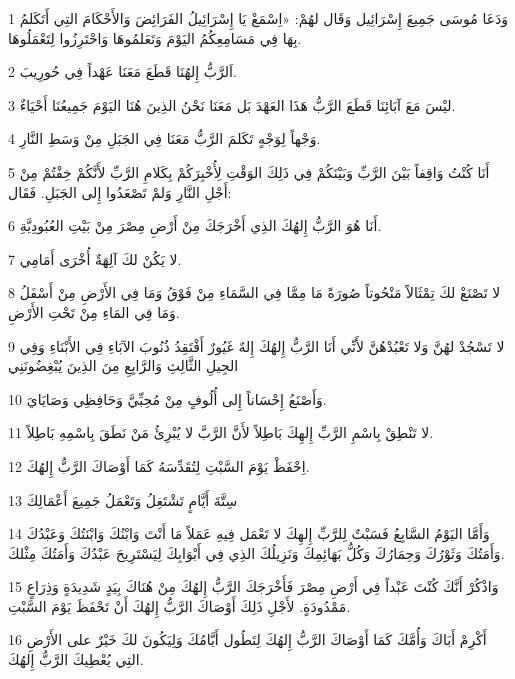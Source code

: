\par 1 وَدَعَا مُوسَى جَمِيعَ إِسْرَائِيل وَقَال لهُمْ: «اِسْمَعْ يَا إِسْرَائِيلُ الفَرَائِضَ وَالأَحْكَامَ التِي أَتَكَلمُ بِهَا فِي مَسَامِعِكُمُ اليَوْمَ وَتَعَلمُوهَا وَاحْتَرِزُوا لِتَعْمَلُوهَا.
\par 2 اَلرَّبُّ إِلهُنَا قَطَعَ مَعَنَا عَهْداً فِي حُورِيبَ.
\par 3 ليْسَ مَعَ آبَائِنَا قَطَعَ الرَّبُّ هَذَا العَهْدَ بَل مَعَنَا نَحْنُ الذِينَ هُنَا اليَوْمَ جَمِيعُنَا أَحْيَاءٌ.
\par 4 وَجْهاً لِوَجْهٍ تَكَلمَ الرَّبُّ مَعَنَا فِي الجَبَلِ مِنْ وَسَطِ النَّارِ.
\par 5 أَنَا كُنْتُ وَاقِفاً بَيْنَ الرَّبِّ وَبَيْنَكُمْ فِي ذَلِكَ الوَقْتِ لِأُخْبِرَكُمْ بِكَلامِ الرَّبِّ لأَنَّكُمْ خِفْتُمْ مِنْ أَجْلِ النَّارِ وَلمْ تَصْعَدُوا إِلى الجَبَلِ. فَقَال:
\par 6 أَنَا هُوَ الرَّبُّ إِلهُكَ الذِي أَخْرَجَكَ مِنْ أَرْضِ مِصْرَ مِنْ بَيْتِ العُبُودِيَّةِ.
\par 7 لا يَكُنْ لكَ آلِهَةٌ أُخْرَى أَمَامِي.
\par 8 لا تَصْنَعْ لكَ تِمْثَالاً مَنْحُوتاً صُورَةً مَا مِمَّا فِي السَّمَاءِ مِنْ فَوْقُ وَمَا فِي الأَرْضِ مِنْ أَسْفَلُ وَمَا فِي المَاءِ مِنْ تَحْتِ الأَرْضِ.
\par 9 لا تَسْجُدْ لهُنَّ وَلا تَعْبُدْهُنَّ لأَنِّي أَنَا الرَّبُّ إِلهُكَ إِلهٌ غَيُورٌ أَفْتَقِدُ ذُنُوبَ الآبَاءِ فِي الأَبْنَاءِ وَفِي الجِيلِ الثَّالِثِ وَالرَّابِعِ مِنَ الذِينَ يُبْغِضُونَنِي
\par 10 وَأَصْنَعُ إِحْسَاناً إِلى أُلُوفٍ مِنْ مُحِبِّيَّ وَحَافِظِي وَصَايَايَ.
\par 11 لا تَنْطِقْ بِاسْمِ الرَّبِّ إِلهِكَ بَاطِلاً لأَنَّ الرَّبَّ لا يُبْرِئُ مَنْ نَطَقَ بِاسْمِهِ بَاطِلاً.
\par 12 اِحْفَظْ يَوْمَ السَّبْتِ لِتُقَدِّسَهُ كَمَا أَوْصَاكَ الرَّبُّ إِلهُكَ.
\par 13 سِتَّةَ أَيَّامٍ تَشْتَغِلُ وَتَعْمَلُ جَمِيعَ أَعْمَالِكَ
\par 14 وَأَمَّا اليَوْمُ السَّابِعُ فَسَبْتٌ لِلرَّبِّ إِلهِكَ لا تَعْمَل فِيهِ عَمَلاً مَا أَنْتَ وَابْنُكَ وَابْنَتُكَ وَعَبْدُكَ وَأَمَتُكَ وَثَوْرُكَ وَحِمَارُكَ وَكُلُّ بَهَائِمِكَ وَنَزِيلُكَ الذِي فِي أَبْوَابِكَ لِيَسْتَرِيحَ عَبْدُكَ وَأَمَتُكَ مِثْلكَ.
\par 15 وَاذْكُرْ أَنَّكَ كُنْتَ عَبْداً فِي أَرْضِ مِصْرَ فَأَخْرَجَكَ الرَّبُّ إِلهُكَ مِنْ هُنَاكَ بِيَدٍ شَدِيدَةٍ وَذِرَاعٍ مَمْدُودَةٍ. لأَجْلِ ذَلِكَ أَوْصَاكَ الرَّبُّ إِلهُكَ أَنْ تَحْفَظَ يَوْمَ السَّبْتِ.
\par 16 أَكْرِمْ أَبَاكَ وَأُمَّكَ كَمَا أَوْصَاكَ الرَّبُّ إِلهُكَ لِتَطُول أَيَّامُكَ وَلِيَكُونَ لكَ خَيْرٌ على الأَرْضِ التِي يُعْطِيكَ الرَّبُّ إِلهُكَ.
